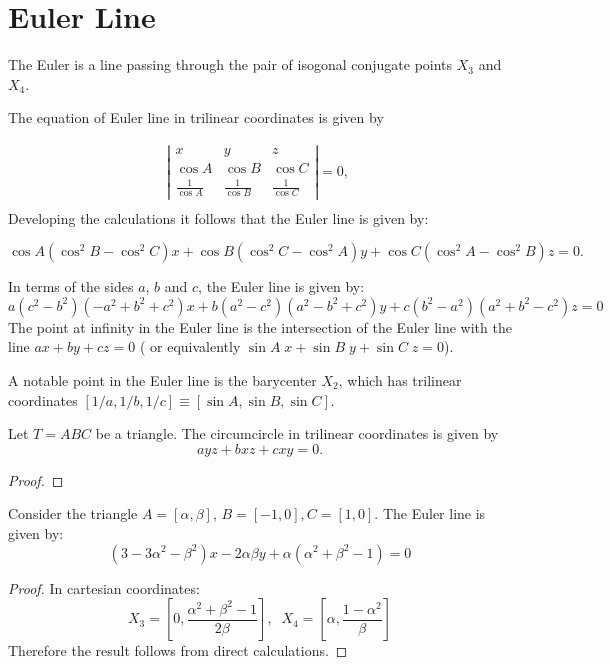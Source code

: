 \section{Euler Line}

The Euler is a line passing through the pair of isogonal conjugate points $X_3$ and $X_4$.

The equation of Euler line in trilinear coordinates is given by

\begin{align*}
	 \left| \begin{matrix} x& y & z\\
	 	\cos A &\cos B &\cos C\\
	 	\frac{1}{\cos A}& \frac{1}{\cos B}& \frac{1}{\cos C} \end{matrix}
	 \right|=0,\; \\
%	 
\end{align*}
Developing the calculations it follows that the Euler line is given by:

\[  \cos A   (  \cos ^  {2}B - \cos^{2}C
) x+\cos B \left( \cos ^{2} C  -\cos^2 A 
\right) y+\cos C \left(   \cos  ^{2}A-  \cos ^2 B   \right) z=0.\]

In terms of the sides $a$, $b$ and $c$, the Euler line is given by:
\[a(c^2 - b^2) (-a^2 + b^2 + c^2)x + b(a^2 - c^2) (a^2 - b^2 + c^2)y + c(b^2 - a^2) (a^2 + b^2 - c^2)z=0
\]
The point at infinity in the Euler line is the intersection of the Euler line with the line  $ax+by+cz=0$ ( or equivalently 
$\sin A \;x+\sin B\; y+\sin C \; z=0$).

A notable point in the Euler line is the barycenter $X_2$,  which has trilinear coordinates
$[1/a,1/b,1/c]\equiv [\sin A, \sin B, \sin C]$. 



\begin{proposition}\label{prop:circumcircle_tri} Let $T=ABC$ be a triangle.
	The circumcircle in trilinear coordinates is given by
	\[a y z+b x z+c x y=0.\]
\end{proposition}

\begin{proof}
	
	\end{proof}
	
	\begin{proposition}
	    Consider the triangle $A=[\alpha,\beta]$, $B=[-1,0], C=[1,0]$.
	    The Euler line is given by:
	   \[ (3-3\alpha^2 - \beta^2  )x - 2\alpha \beta y + \alpha(\alpha^2 + \beta^2 - 1)=0\]
	\end{proposition}
	
	\begin{proof} In cartesian coordinates:
	\[ X_3=[0, \frac{\alpha^2 + \beta^2 - 1}{2\beta}],\;\; X_4=[\alpha, \frac{1-\alpha^2  }{\beta}]
	\]
	 Therefore the result follows from direct calculations.   
	\end{proof}
	